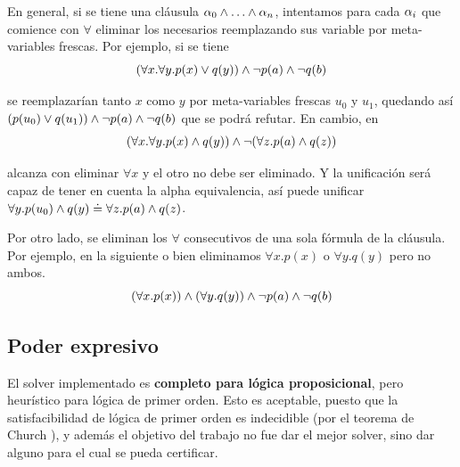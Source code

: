 En general, si se tiene una cláusula 
\(
    \anyForm_0 \fAnd \dots \fAnd \anyForm_n
\), intentamos para cada $\alpha_i$ que comience con $\forall$ eliminar los necesarios reemplazando sus variable por meta-variables frescas. Por ejemplo,  si se tiene
\[
    (\forall x. \forall y . p(x) \vee q(y)) \wedge \neg p(a) \wedge \neg q(b)
\]

se reemplazarían tanto $x$ como $y$ por meta-variables frescas $u_0$ y $u_1$, quedando así $(p(u_0) \vee q(u_1)) \wedge \neg p(a) \wedge \neg q(b)$ que se podrá refutar. En cambio, en
\[
    (\forall x. \forall y . p(x) \wedge q(y)) \wedge \neg (\forall z. p(a) \wedge q(z))
\]

alcanza con eliminar $\forall x$ y el otro no debe ser eliminado. Y la unificación será capaz de tener en cuenta la alpha equivalencia, así puede unificar $\forall y . p(u_0) \wedge q(y) \doteq \forall z. p(a) \wedge q(z)$.

Por otro lado, se eliminan los $\forall$ consecutivos de una sola fórmula de la cláusula. Por ejemplo, en la siguiente o bien eliminamos $\forall x . p(x)$ o $\forall y . q(y)$ pero no ambos.
\[
    (\forall x . p(x)) \wedge (\forall y . q(y)) \wedge \neg p(a) \wedge \neg q(b)
\]

\subsection{Poder expresivo}


El solver implementado es \textbf{completo para lógica proposicional}, pero heurístico para lógica de primer orden. Esto es aceptable, puesto que la satisfacibilidad de lógica de primer orden es indecidible (por el teorema de Church \cite{church}), y además el objetivo del trabajo no fue dar el mejor solver, sino dar alguno para el cual se pueda certificar. 

